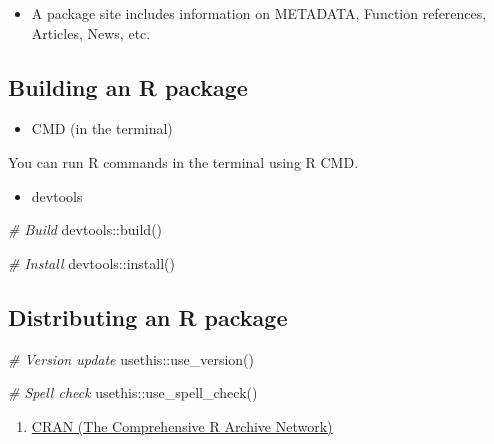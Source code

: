 \documentclass[
]{book}
\newenvironment{Shaded}{\begin{snugshade}}{\end{snugshade}}
\newcommand{\CommentTok}[1]{\textcolor[rgb]{0.56,0.35,0.01}{\textit{#1}}}
\newcommand{\FunctionTok}[1]{\textcolor[rgb]{0.00,0.00,0.00}{#1}}
\newcommand{\NormalTok}[1]{#1}
\newcommand{\SpecialCharTok}[1]{\textcolor[rgb]{0.00,0.00,0.00}{#1}}
\providecommand{\tightlist}{%
  \setlength{\itemsep}{0pt}\setlength{\parskip}{0pt}}
\begin{document}
\begin{itemize}
\tightlist
\item
  A package site includes information on METADATA, Function references, Articles, News, etc.
\end{itemize}

\hypertarget{building-an-r-package}{%
\subsection{Building an R package}\label{building-an-r-package}}

\begin{itemize}
\tightlist
\item
  CMD (in the terminal)
\end{itemize}

You can run R commands in the terminal using R CMD.

\begin{itemize}
\tightlist
\item
  devtools
\end{itemize}

\begin{Shaded}
\begin{Highlighting}[]
\CommentTok{\# Build }
\NormalTok{devtools}\SpecialCharTok{::}\FunctionTok{build}\NormalTok{()}

\CommentTok{\# Install }
\NormalTok{devtools}\SpecialCharTok{::}\FunctionTok{install}\NormalTok{()}
\end{Highlighting}
\end{Shaded}

\hypertarget{distributing-an-r-package}{%
\subsection{Distributing an R package}\label{distributing-an-r-package}}

\begin{Shaded}
\begin{Highlighting}[]
\CommentTok{\# Version update }
\NormalTok{usethis}\SpecialCharTok{::}\FunctionTok{use\_version}\NormalTok{()}

\CommentTok{\# Spell check}
\NormalTok{usethis}\SpecialCharTok{::}\FunctionTok{use\_spell\_check}\NormalTok{()}
\end{Highlighting}
\end{Shaded}

\begin{enumerate}
\def\labelenumi{\arabic{enumi}.}
\tightlist
\item
  \href{https://cran.r-project.org/}{CRAN (The Comprehensive R Archive Network)}
\end{enumerate}
\end{document}
